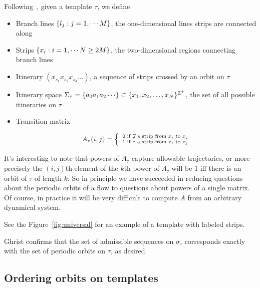 \documentclass[paper.tex]{subfiles}
\begin{document}
\begin{definition}
  Following~\cite{knottyode}, given a template $\tau$, we define
  \begin{itemize}
    \item Branch lines  $\{ l_j : j = 1, \cdots M \}$, the one-dimensional lines strips are connected along
    \item Strips $\{ x_i : i = 1, \cdots N \geq 2 M \}$, the two-dimensional regions connecting branch lines
    \item Itinerary $(x_{s_1}x_{s_2}x_{s_3} \dots)$, a sequence of strips crossed by an orbit on $\tau$
    \item Itinerary space $\Sigma_\tau = \set{a_0 a_1 a_2 \cdots} \subset \set{x_1, x_2, \ldots, x_N}^{\Z^+}$, the set of all possible itineraries on $\tau$
    \item Transition matrix

      \begin{equation}
        A_\tau(i,j) = \left\{ \
        \begin{smallmatrix}
          0 \text{ if } \not\exists \text{ a strip from } x_i \text{ to } x_j \\
          1 \text{ if } \exists \text{ a strip from } x_i \text{ to } x_j
        \end{smallmatrix}
        \right.
      \end{equation}
  \end{itemize}
\end{definition}

It's interesting to note that powers of $A_\tau$ capture allowable trajectories, or more precisely the $(i,j)$th element of the $k$th power of $A_\tau$ will be $1$ iff there is an orbit of $\tau$ of length $k$.
So in principle we have succeeded in reducing questions about the periodic orbits of a flow to questions about powers of a single matrix. Of course, in practice it will be very difficult to compute $A$ from an arbitrary
dynamical system.

See the Figure~\ref{fig:universal} for an example of a template with labeled strips.

Ghrist confirms that the set of admissible sequences on $\sigma_\tau$ corresponds exactly with the set of periodic orbits on $\tau$, as desired.


\subsection{Ordering orbits on templates}
\end{document}
